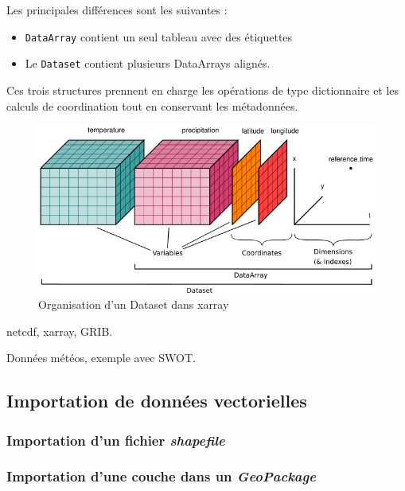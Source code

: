 \documentclass[11pt]{article}
\begin{document}
Les principales différences sont les suivantes :

\begin{itemize}
\item
  \texttt{DataArray} contient un seul tableau avec des étiquettes
\item
  Le \texttt{Dataset} contient plusieurs DataArrays alignés.
\end{itemize}

Ces trois structures prennent en charge les opérations de type
dictionnaire et les calculs de coordination tout en conservant les
métadonnées.

\begin{figure}
\centering
\includegraphics{images/xarray-dataset-diagram.png}
\caption{Organisation d'un Dataset dans xarray}
\end{figure}

netcdf, xarray, GRIB.

Données météos, exemple avec SWOT.

\hypertarget{importation-de-donnuxe9es-vectorielles}{%
\subsection{Importation de données
vectorielles}\label{importation-de-donnuxe9es-vectorielles}}

\hypertarget{importation-dun-fichier-shapefile}{%
\subsubsection{\texorpdfstring{Importation d'un fichier
\emph{shapefile}}{Importation d'un fichier shapefile}}\label{importation-dun-fichier-shapefile}}

\hypertarget{importation-dune-couche-dans-un-geopackage}{%
\subsubsection{\texorpdfstring{Importation d'une couche dans un
\emph{GeoPackage}}{Importation d'une couche dans un GeoPackage}}\label{importation-dune-couche-dans-un-geopackage}}
\end{document}
